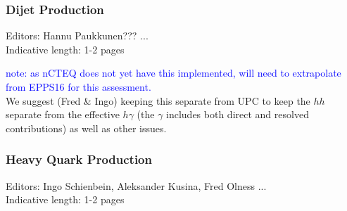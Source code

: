 \documentclass[../report.tex]{subfiles}
\begin{document}
\subsubsection{Dijet Production}
Editors: Hannu Paukkunen??? ... \\
Indicative length: 1-2 pages 

\noindent
\textcolor{blue}{note: as nCTEQ does not yet have this implemented,
will need to extrapolate from EPPS16\cite{Eskola:2016oht} for this assessment.}
\\
We suggest (Fred \& Ingo) keeping this separate from UPC 
to keep the $hh$ separate from the effective $h \gamma$ 
(the $\gamma$ includes both direct and resolved contributions) as well as other issues.

\subsubsection{Heavy Quark Production}
Editors: Ingo Schienbein, Aleksander Kusina, Fred Olness ... \\
Indicative length: 1-2 pages 
\end{document}
